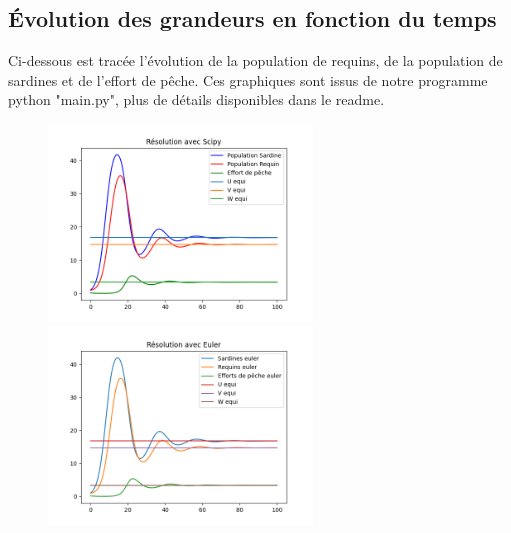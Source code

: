 \documentclass[a4paper, 11pt]{report}%
\begin{document}
        
        \subsection{Évolution des grandeurs en fonction du temps}
        Ci-dessous est tracée l'évolution de la population de requins, de la population de sardines et de l'effort de pêche. Ces graphiques
        sont issus de notre programme python "main.py", plus de détails disponibles dans le readme. 
        \begin{figure}[!h]
    		\begin{minipage}[b]{.4\textwidth}
        		\centering
        		\includegraphics[width=7cm]{figures/Scipy_good_conditions.png}
    		\end{minipage}
    		\hfill
    		\begin{minipage}[b]{.4\textwidth}
        		\centering
       			\includegraphics[width=7cm]{figures/Euler_good_conditions.png}
    		\end{minipage}
    		
		\end{figure}
\end{document}
